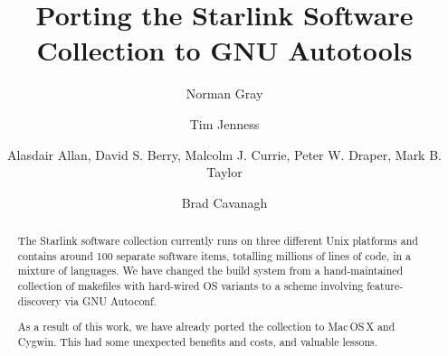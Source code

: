 \documentclass[11pt,twoside]{article}
\begin{document}

\title{Porting the Starlink Software Collection to GNU Autotools}
\marginpar{[v\RCSRevision]}

\author{Norman Gray}
\author{Tim Jenness}
\author{Alasdair Allan,
    David S. Berry,
    Malcolm J. Currie,
    Peter W. Draper,
    Mark B. Taylor}
\author{Brad Cavanagh}







\begin{abstract}
The Starlink software collection currently runs on three different
Unix platforms and contains around 100 separate software items,
totalling millions of lines of code, in a mixture of languages.  We
have changed the build system from a hand-maintained collection of
makefiles with hard-wired OS variants to a scheme involving
feature-discovery via GNU Autoconf.

As a result of this work, we have already ported the collection to
Mac\,OS\,X and Cygwin.  This had some unexpected benefits and costs, and
valuable lessons.
\end{abstract}
\end{document}
